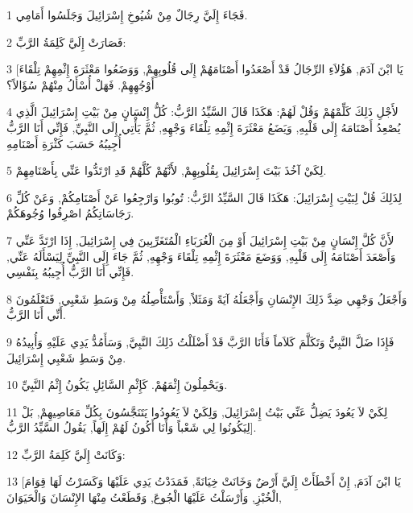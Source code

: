 \par 1 فَجَاءَ إِلَيَّ رِجَالٌ مِنْ شُيُوخِ إِسْرَائِيلَ وَجَلَسُوا أَمَامِي.
\par 2 فَصَارَتْ إِلَيَّ كَلِمَةُ الرَّبِّ:
\par 3 [يَا ابْنَ آدَمَ, هَؤُلاَءِ الرِّجَالُ قَدْ أَصْعَدُوا أَصْنَامَهُمْ إِلَى قُلُوبِهِمْ, وَوَضَعُوا مَعْثَرَةَ إِثْمِهِمْ تِلْقَاءَ أَوْجُهِهِمْ. فَهَلْ أُسْأَلُ مِنْهُمْ سُؤَالاً؟
\par 4 لأَجْلِ ذَلِكَ كَلِّمْهُمْ وَقُلْ لَهُمْ: هَكَذَا قَالَ السَّيِّدُ الرَّبُّ: كُلُّ إِنْسَانٍ مِنْ بَيْتِ إِسْرَائِيلَ الَّذِي يُصْعِدُ أَصْنَامَهُ إِلَى قَلْبِهِ, وَيَضَعُ مَعْثَرَةَ إِثْمِهِ تِلْقَاءَ وَجْهِهِ, ثُمَّ يَأْتِي إِلَى النَّبِيِّ, فَإِنِّي أَنَا الرَّبُّ أُجِيبُهُ حَسَبَ كَثْرَةِ أَصْنَامِهِ
\par 5 لِكَيْ آخُذَ بَيْتَ إِسْرَائِيلَ بِقُلُوبِهِمْ, لأَنَّهُمْ كُلَّهُمْ قَدِ ارْتَدُّوا عَنِّي بِأَصْنَامِهِمْ.
\par 6 لِذَلِكَ قُلْ لِبَيْتِ إِسْرَائِيلَ: هَكَذَا قَالَ السَّيِّدُ الرَّبُّ: تُوبُوا وَارْجِعُوا عَنْ أَصْنَامِكُمْ, وَعَنْ كُلِّ رَجَاسَاتِكُمُ اصْرِفُوا وُجُوهَكُمْ.
\par 7 لأَنَّ كُلَّ إِنْسَانٍ مِنْ بَيْتِ إِسْرَائِيلَ أَوْ مِنَ الْغُرَبَاءِ الْمُتَغَرِّبِينَ فِي إِسْرَائِيلَ, إِذَا ارْتَدَّ عَنِّي وَأَصْعَدَ أَصْنَامَهُ إِلَى قَلْبِهِ, وَوَضَعَ مَعْثَرَةَ إِثْمِهِ تِلْقَاءَ وَجْهِهِ, ثُمَّ جَاءَ إِلَى النَّبِيِّ لِيَسْأَلَهُ عَنِّي, فَإِنِّي أَنَا الرَّبُّ أُجِيبُهُ بِنَفْسِي.
\par 8 وَأَجْعَلُ وَجْهِي ضِدَّ ذَلِكَ الإِنْسَانِ وَأَجْعَلُهُ آيَةً وَمَثَلاً, وَأَسْتَأْصِلُهُ مِنْ وَسَطِ شَعْبِي, فَتَعْلَمُونَ أَنِّي أَنَا الرَّبُّ.
\par 9 فَإِذَا ضَلَّ النَّبِيُّ وَتَكَلَّمَ كَلاَماً فَأَنَا الرَّبَّ قَدْ أَضْلَلْتُ ذَلِكَ النَّبِيَّ, وَسَأَمُدُّ يَدِي عَلَيْهِ وَأُبِيدُهُ مِنْ وَسَطِ شَعْبِي إِسْرَائِيلَ.
\par 10 وَيَحْمِلُونَ إِثْمَهُمْ. كَإِثْمِ السَّائِلِ يَكُونُ إِثْمُ النَّبِيِّ.
\par 11 لِكَيْ لاَ يَعُودَ يَضِلُّ عَنِّي بَيْتُ إِسْرَائِيلَ, وَلِكَيْ لاَ يَعُودُوا يَتَنَجَّسُونَ بِكُلِّ مَعَاصِيهِمْ, بَلْ لِيَكُونُوا لِي شَعْباً وَأَنَا أَكُونُ لَهُمْ إِلَهاً, يَقُولُ السَّيِّدُ الرَّبُّ].
\par 12 وَكَانَتْ إِلَيَّ كَلِمَةُ الرَّبِّ:
\par 13 [يَا ابْنَ آدَمَ, إِنْ أَخْطَأَتْ إِلَيَّ أَرْضٌ وَخَانَتْ خِيَانَةً, فَمَدَدْتُ يَدِي عَلَيْهَا وَكَسَرْتُ لَهَا قِوَامَ الْخُبْزِ, وَأَرْسَلْتُ عَلَيْهَا الْجُوعَ, وَقَطَعْتُ مِنْهَا الإِنْسَانَ وَالْحَيَوَانَ,
